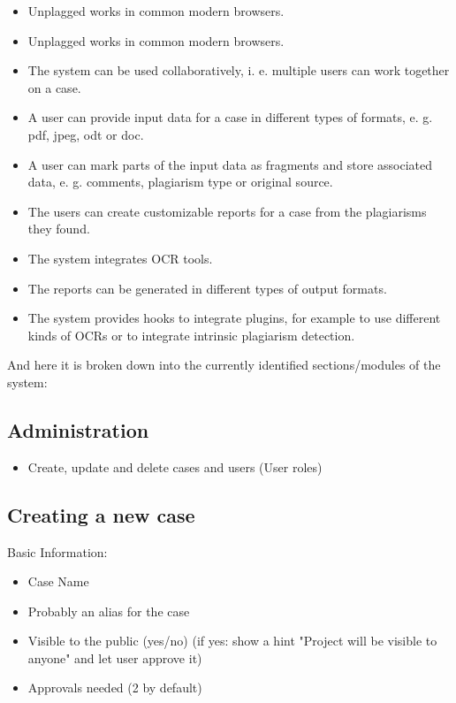 \begin{itemize}
\item Unplagged works in common modern browsers.
\item Unplagged works in common modern browsers.
\item The system can be used collaboratively, i. e. multiple users can work together on a case.
\item A user can provide input data for a case in different types of formats, e. g. pdf, jpeg, odt or doc.
\item A user can mark parts of the input data as fragments and store associated data, e. g. comments, plagiarism type or original source.
\item The users can create customizable reports for a case from the plagiarisms they found.
\item The system integrates OCR tools.
\item The reports can be generated in different types of output formats.
\item The system provides hooks to integrate plugins, for example to use different kinds of OCRs or to integrate intrinsic plagiarism detection.
\end{itemize}

And here it is broken down into the currently identified sections/modules of the system:

\subsection{Administration}

\begin{itemize}
\item Create, update and delete cases and users (User roles)
\end{itemize}

\subsection{Creating a new case}

Basic Information:
\begin{itemize}
\item Case Name
\item Probably an alias for the case
\item Visible to the public (yes/no) (if yes: show a hint "Project will be visible to anyone" and let user approve it)
\item Approvals needed (2 by default)
\end{itemize}

